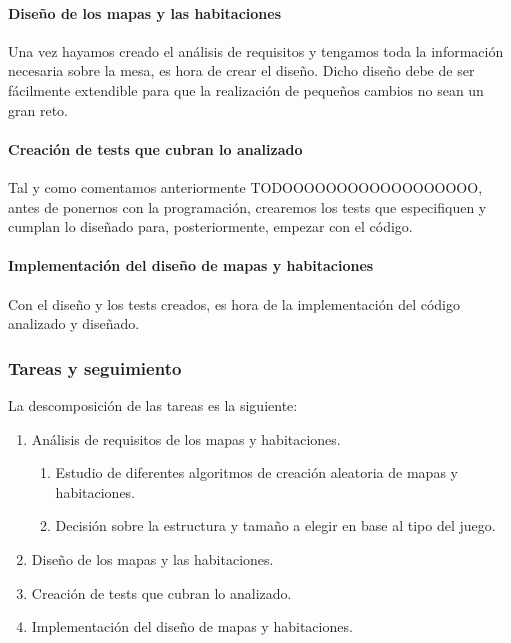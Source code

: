\paragraph{Diseño de los mapas y las habitaciones} Una vez hayamos creado el análisis de requisitos y tengamos toda la información necesaria sobre la mesa, es hora de crear el diseño. Dicho diseño debe de ser fácilmente extendible para que la realización de pequeños cambios no sean un gran reto.

\paragraph{Creación de tests que cubran lo analizado} Tal y como comentamos anteriormente TODOOOOOOOOOOOOOOOOOO, antes de ponernos con la programación, crearemos los tests que especifiquen y cumplan lo diseñado para, posteriormente, empezar con el código.

\paragraph{Implementación del diseño de mapas y habitaciones} Con el diseño y los tests creados, es hora de la implementación del código analizado y diseñado.

\subsubsection{Tareas y seguimiento}

La descomposición de las tareas es la siguiente:

\begin{enumerate}[label=\bfseries WBS 2.\arabic*]
  \item Análisis de requisitos de los mapas y habitaciones.
    \begin{enumerate}[label=\bfseries WBS 2.1.\arabic*]
      \item Estudio de diferentes algoritmos de creación aleatoria de mapas y habitaciones.
      \item Decisión sobre la estructura y tamaño a elegir en base al tipo del juego.
    \end{enumerate}
  \item Diseño de los mapas y las habitaciones.
  \item Creación de tests que cubran lo analizado.
  \item Implementación del diseño de mapas y habitaciones.
\end{enumerate}

